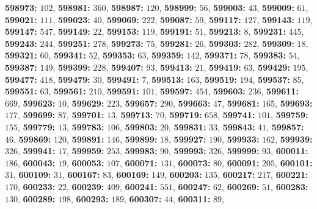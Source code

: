 \textsf{\bfseries 598973:} $102$, \textsf{\bfseries 598981:} $360$, \textsf{\bfseries 598987:} $120$, \textsf{\bfseries 598999:} $56$, \textsf{\bfseries 599003:} $43$, \textsf{\bfseries 599009:} $61$, \textsf{\bfseries 599021:} $111$, \textsf{\bfseries 599023:} $40$, \textsf{\bfseries 599069:} $222$, \textsf{\bfseries 599087:} $59$, \textsf{\bfseries 599117:} $127$, \textsf{\bfseries 599143:} $119$, \textsf{\bfseries 599147:} $547$, \textsf{\bfseries 599149:} $22$, \textsf{\bfseries 599153:} $119$, \textsf{\bfseries 599191:} $51$, \textsf{\bfseries 599213:} $8$, \textsf{\bfseries 599231:} $445$, \textsf{\bfseries 599243:} $244$, \textsf{\bfseries 599251:} $278$, \textsf{\bfseries 599273:} $75$, \textsf{\bfseries 599281:} $26$, \textsf{\bfseries 599303:} $282$, \textsf{\bfseries 599309:} $18$, \textsf{\bfseries 599321:} $60$, \textsf{\bfseries 599341:} $52$, \textsf{\bfseries 599353:} $63$, \textsf{\bfseries 599359:} $142$, \textsf{\bfseries 599371:} $78$, \textsf{\bfseries 599383:} $54$, \textsf{\bfseries 599387:} $149$, \textsf{\bfseries 599399:} $228$, \textsf{\bfseries 599407:} $93$, \textsf{\bfseries 599413:} $21$, \textsf{\bfseries 599419:} $63$, \textsf{\bfseries 599429:} $195$, \textsf{\bfseries 599477:} $418$, \textsf{\bfseries 599479:} $30$, \textsf{\bfseries 599491:} $7$, \textsf{\bfseries 599513:} $163$, \textsf{\bfseries 599519:} $194$, \textsf{\bfseries 599537:} $85$, \textsf{\bfseries 599551:} $63$, \textsf{\bfseries 599561:} $210$, \textsf{\bfseries 599591:} $101$, \textsf{\bfseries 599597:} $454$, \textsf{\bfseries 599603:} $236$, \textsf{\bfseries 599611:} $669$, \textsf{\bfseries 599623:} $10$, \textsf{\bfseries 599629:} $223$, \textsf{\bfseries 599657:} $290$, \textsf{\bfseries 599663:} $47$, \textsf{\bfseries 599681:} $165$, \textsf{\bfseries 599693:} $177$, \textsf{\bfseries 599699:} $87$, \textsf{\bfseries 599701:} $13$, \textsf{\bfseries 599713:} $70$, \textsf{\bfseries 599719:} $658$, \textsf{\bfseries 599741:} $101$, \textsf{\bfseries 599759:} $155$, \textsf{\bfseries 599779:} $13$, \textsf{\bfseries 599783:} $106$, \textsf{\bfseries 599803:} $20$, \textsf{\bfseries 599831:} $33$, \textsf{\bfseries 599843:} $41$, \textsf{\bfseries 599857:} $46$, \textsf{\bfseries 599869:} $120$, \textsf{\bfseries 599891:} $146$, \textsf{\bfseries 599899:} $18$, \textsf{\bfseries 599927:} $190$, \textsf{\bfseries 599933:} $162$, \textsf{\bfseries 599939:} $326$, \textsf{\bfseries 599941:} $17$, \textsf{\bfseries 599959:} $253$, \textsf{\bfseries 599983:} $90$, \textsf{\bfseries 599993:} $326$, \textsf{\bfseries 599999:} $93$, \textsf{\bfseries 600011:} $186$, \textsf{\bfseries 600043:} $19$, \textsf{\bfseries 600053:} $107$, \textsf{\bfseries 600071:} $131$, \textsf{\bfseries 600073:} $80$, \textsf{\bfseries 600091:} $205$, \textsf{\bfseries 600101:} $31$, \textsf{\bfseries 600109:} $31$, \textsf{\bfseries 600167:} $83$, \textsf{\bfseries 600169:} $149$, \textsf{\bfseries 600203:} $135$, \textsf{\bfseries 600217:} $217$, \textsf{\bfseries 600221:} $170$, \textsf{\bfseries 600233:} $22$, \textsf{\bfseries 600239:} $409$, \textsf{\bfseries 600241:} $551$, \textsf{\bfseries 600247:} $62$, \textsf{\bfseries 600269:} $51$, \textsf{\bfseries 600283:} $130$, \textsf{\bfseries 600289:} $198$, \textsf{\bfseries 600293:} $189$, \textsf{\bfseries 600307:} $44$, \textsf{\bfseries 600311:} $89$, 
